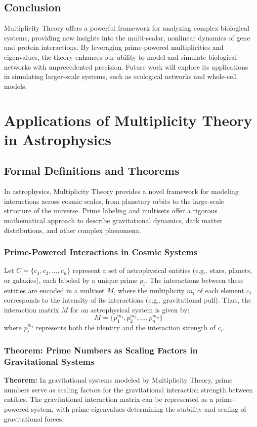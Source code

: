 \documentclass[%
 preprint, linenumbers,
 amsmath,amssymb,
 aps, physrev,
]{revtex4-2}
\begin{document}
\subsection{Conclusion}
Multiplicity Theory offers a powerful framework for analyzing complex biological systems, providing new insights into the multi-scalar, nonlinear dynamics of gene and protein interactions. By leveraging prime-powered multiplicities and eigenvalues, the theory enhances our ability to model and simulate biological networks with unprecedented precision. Future work will explore its applications in simulating larger-scale systems, such as ecological networks and whole-cell models.
\section{Applications of Multiplicity Theory in Astrophysics}
\label{sec:Astrophysics}

\subsection{Formal Definitions and Theorems}
In astrophysics, Multiplicity Theory provides a novel framework for modeling interactions across cosmic scales, from planetary orbits to the large-scale structure of the universe. Prime labeling and multisets offer a rigorous mathematical approach to describe gravitational dynamics, dark matter distributions, and other complex phenomena.

\subsubsection{Prime-Powered Interactions in Cosmic Systems}
Let \( C = \{c_1, c_2, \dots, c_n\} \) represent a set of astrophysical entities (e.g., stars, planets, or galaxies), each labeled by a unique prime \( p_i \). The interactions between these entities are encoded in a multiset \( M \), where the multiplicity \( m_i \) of each element \( c_i \) corresponds to the intensity of its interactions (e.g., gravitational pull). Thus, the interaction matrix \( M \) for an astrophysical system is given by:
\[
M = \{p_1^{m_1}, p_2^{m_2}, \dots, p_n^{m_n}\}
\]
where \( p_i^{m_i} \) represents both the identity and the interaction strength of \( c_i \).

\subsubsection{Theorem: Prime Numbers as Scaling Factors in Gravitational Systems}
\textbf{Theorem:} In gravitational systems modeled by Multiplicity Theory, prime numbers serve as scaling factors for the gravitational interaction strength between entities. The gravitational interaction matrix can be represented as a prime-powered system, with prime eigenvalues determining the stability and scaling of gravitational forces.
\end{document}
